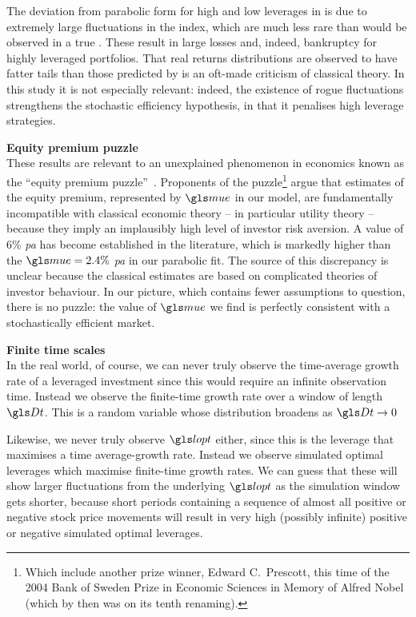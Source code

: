 The deviation from parabolic form for high and low leverages in  is due to extremely large fluctuations in the index, which are much less rare than would be observed in a true \GBM. These result in large losses and, indeed, bankruptcy for highly leveraged portfolios. That real returns distributions are observed to have fatter tails than those predicted by \GBM is an oft-made criticism of classical theory. In this study it is not especially relevant: indeed, the existence of rogue fluctuations strengthens the stochastic efficiency hypothesis, in that it penalises high leverage strategies.

\textbf{Equity premium puzzle}\\
These results are relevant to an unexplained phenomenon in economics known as the ``equity premium puzzle''~\cite{MehraPrescott1985}. Proponents of the puzzle\footnote{Which include another prize winner, Edward C.\ Prescott, this time of the 2004 Bank of Sweden Prize in Economic Sciences in Memory of Alfred Nobel (which by then was on its tenth renaming).} argue that estimates of the equity premium, represented by $\mue$ in our model, are fundamentally incompatible with classical economic theory -- in particular utility theory -- because they imply an implausibly high level of investor risk aversion. A value of 6\% \textit{pa} has become established in the literature, which is markedly higher than the $\mue=2.4\%$ \textit{pa} in our parabolic fit. The source of this discrepancy is unclear because the classical estimates are based on complicated theories of investor behaviour. In our picture, which contains fewer assumptions to question, there is no puzzle: the value of $\mue$ we find is perfectly consistent with a stochastically efficient market.

\textbf{Finite time scales}\\
In the real world, of course, we can never truly observe the time-average growth rate of a leveraged investment since this would require an infinite observation time. Instead we observe the finite-time growth rate over a window of length $\Dt$. This is a random variable whose distribution broadens as $\Dt\to0$

Likewise, we never truly observe $\lopt$ either, since this is the leverage that maximises a time average-growth rate. Instead we observe simulated optimal leverages which maximise finite-time growth rates. We can guess that these will show larger fluctuations from the underlying $\lopt$ as the simulation window gets shorter, because short periods containing a sequence of almost all positive or negative stock price movements will result in very high (possibly infinite) positive or negative simulated optimal leverages.

